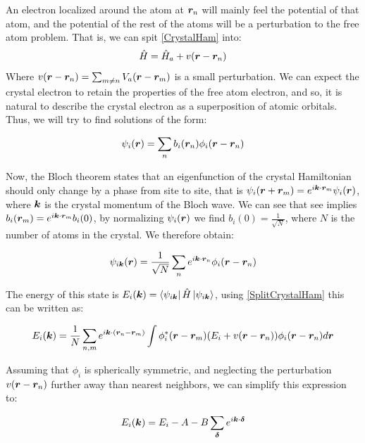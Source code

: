 An electron localized around the atom at $\boldsymbol{r}_n$ will mainly feel the potential of that atom, and the potential of the rest of the atoms will be a perturbation to the free atom problem. That is, we can spit \ref{CrystalHam} into:
\begin{equation}
\label{SplitCrystalHam}
\hat{H} = \hat{H}_a + v(\boldsymbol{r}-\boldsymbol{r}_n)
\end{equation}
Where $v(\boldsymbol{r}-\boldsymbol{r}_n) = \sum_{m \neq n} V_a(\boldsymbol{r}-\boldsymbol{r}_m)$ is a small perturbation. We can expect the crystal electron to retain the properties of the free atom electron, and so, it is natural to describe the crystal electron as a superposition of atomic orbitals. Thus, we will try to find solutions of the form:

\begin{equation}
\psi_i(\boldsymbol{r}) = \sum_n b_i(\boldsymbol{r}_n) \phi_i(\boldsymbol{r}-\boldsymbol{r}_n)
\end{equation}

Now, the Bloch theorem states that an eigenfunction of the crystal Hamiltonian should only change by a phase from site to site, that is $\psi_i(\boldsymbol{r}+\boldsymbol{r}_m)=e^{i \boldsymbol{k} \cdot \boldsymbol{r}_m}\psi_i(\boldsymbol{r})$, where $\boldsymbol{k}$ is the crystal momentum of the Bloch wave. We can see that see implies $b_i(\boldsymbol{r}_m) = e^{i \boldsymbol{k} \cdot \boldsymbol{r}_m}b_i(0)$, by normalizing $\psi_i(\boldsymbol{r})$ we find $b_i(0) = \frac{1}{\sqrt{N}}$, where $N$ is the number of atoms in the crystal. We therefore obtain:

\begin{equation}
\psi_{i\boldsymbol{k}}(\boldsymbol{r}) = \frac{1}{\sqrt{N}}\sum_n  e^{i \boldsymbol{k} \cdot \boldsymbol{r}_n} \phi_i(\boldsymbol{r}-\boldsymbol{r}_n)
\end{equation}

The energy of this state is $E_i(\boldsymbol{k}) = \bra{\psi_{i\boldsymbol{k}}} \hat{H} \ket{\psi_{i\boldsymbol{k}}}$, using \ref{SplitCrystalHam} this can be written as:

\begin{equation}
E_i(\boldsymbol{k}) = \frac{1}{N} \sum_{n,m} e^{i\boldsymbol{k}\cdot(\boldsymbol{r}_n-\boldsymbol{r}_m)} \int \phi_i^*(\boldsymbol{r}-\boldsymbol{r}_m) (E_i+v(\boldsymbol{r}-\boldsymbol{r}_n)) \phi_i(\boldsymbol{r}-\boldsymbol{r}_n) d\boldsymbol{r}
\end{equation}

Assuming that $\phi_i$ is spherically symmetric, and neglecting the perturbation $v(\boldsymbol{r}-\boldsymbol{r}_n)$ further away than nearest neighbors, we can simplify this expression to:

\begin{equation}
\label{TBBand}
E_i(\boldsymbol{k}) = E_i - A - B\sum_{\boldsymbol{\delta}} e^{i\boldsymbol{k}\cdot \boldsymbol{\delta}}
\end{equation}

